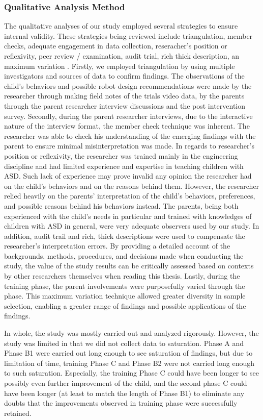 \documentclass{ut-thesis}
\begin{document}
\subsubsection{Qualitative Analysis Method}
The qualitative analyses of our study employed several strategies to ensure internal validity.  These strategies being reviewed include triangulation, member checks, adequate engagement in data collection, reseracher's position or reflexivity, peer review / examination, audit trial, rich thick description, an maximum variation \cite{merriam2014qualitative}.  Firstly, we employed triangulation by using multiple investigators and sources of data to confirm findings.  The observations of the child's behaviors and possible robot design recommendations were made by the researcher through making field notes of the trials video data, by the parents through the parent researcher interview discussions and the post intervention survey.  Secondly, during the parent researcher interviews, due to the interactive nature of the interview format, the member check technique was inherent.  The researcher was able to check his understanding of the emerging findings with the parent to ensure minimal misinterpretation was made.  In regards to researcher's position or reflexivity, the researcher was trained mainly in the engineering discipline and had limited experience and expertise in teaching children with ASD.  Such lack of experience may prove invalid any opinion the researcher had on the child's behaviors and on the reasons behind them.  However, the researcher relied heavily on the parents' interpretation of the child's behaviors, preferences, and possible reasons behind his behaviors instead.  The parents, being both experienced with the child's needs in particular and trained with knowledges of children with ASD in general, were very adequate observers used by our study.  In addition, audit trail and rich, thick descriptions were used to compensate the researcher's interpretation errors.  By providing a detailed account of the backgrounds, methods, procedures, and decisions made when conducting the study, the value of the study results can be critically assessed based on contexts by other researchers themselves when reading this thesis.  Lastly, during the training phase, the parent involvements were purposefully varied through the phase.  This maximum variation technique allowed greater diversity in sample selection, enabling a greater range of findings and possible applications of the findings.

In whole, the study was mostly carried out and analyzed rigorously.  However, the study was limited in that we did not collect data to saturation.  Phase A and Phase B1 were carried out long enough to see saturation of findings, but due to limitation of time, training Phase C and Phase B2 were not carried long enough to such saturation.  Especially, the training Phase C could have been longer to see possibly even further improvement of the child, and the second phase C could have been longer (at least to match the length of Phase B1) to eliminate any doubts that the improvements observed in training phase were successfully retained.
\end{document}

